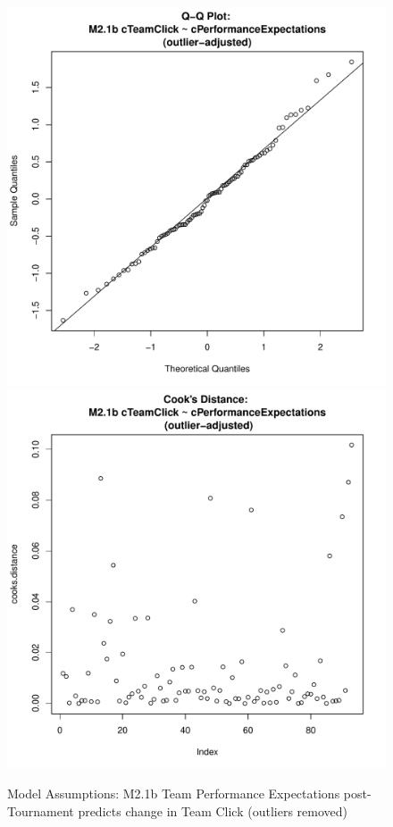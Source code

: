 \documentclass[12pt]{report}
\begin{document}
{\begin{figure}[htbp]
  \includegraphics[scale =.4]{../images/MLM21bOutQQNorm.pdf}
  \includegraphics[scale =.4]{../images/MLM21bOutCooksD.pdf}
  \caption{Model Assumptions: M2.1b Team Performance Expectations post-Tournament predicts change in Team Click (outliers removed)}
  \label{fig:MLM21bOutAssumptions}
\end{figure}

}
\end{document}
